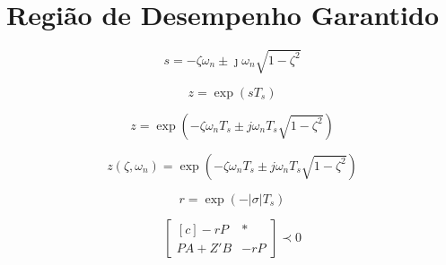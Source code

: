 \chapter{Região de Desempenho Garantido}

\begin{equation}
  s = -\zeta\omega_n \pm \jmath\omega_n \sqrt {1-\zeta^2} \label{eq:PontoPlanoS}
\end{equation}

\begin{equation}
  z = \exp(sT_s)\label{eq:TransformacaoSZ}
\end{equation}

\begin{equation}
  z = \exp{\left(-\zeta\omega_nT_s \pm j\omega_nT_s\sqrt{1-\zeta^2}\right)}\label{eq:PontoPlanoZ}
\end{equation}

\begin{equation}
  z(\zeta,\omega_n) = \exp{\left(-\zeta\omega_nT_s \pm j\omega_nT_s\sqrt{1-\zeta^2}\right)}\label{eq:FuncaoPontoZ}
\end{equation}

\begin{equation}
  r = \exp{\left(-|\sigma|T_s\right)}\label{eq:RaioEstabilidadeRelativa}
\end{equation}

\begin{figure}
  \centering
\end{figure}

\begin{figure}
  \centering
\end{figure}

\begin{figure}
  \centering
\end{figure}

\begin{figure}
  \centering
\end{figure}

\begin{figure}
  \centering
\end{figure}

\begin{figure}
  \centering
\end{figure}

\begin{equation}
  \begin{bmatrix*}[c]
    -rP       & * \\
    PA + Z'B  & -rP
  \end{bmatrix*}
  \prec 0\label{eq:LMIEstabilidadeRelativa}
\end{equation}

